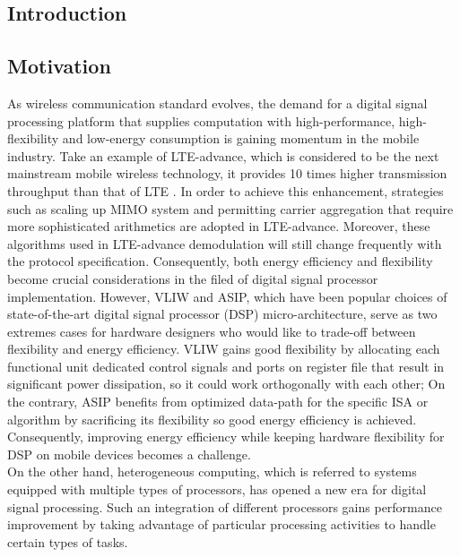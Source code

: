 \documentclass[12pt]{article}
\begin{document}
\begin{CJK}{UTF8}{bkai}
\doublespacing


\section{Introduction}

    \subsection{Motivation}
        As wireless communication standard evolves, the demand for a digital signal processing platform that supplies computation with high-performance, high-flexibility and low-energy consumption is gaining momentum in the mobile industry. 
        Take an example of LTE-advance, which is considered to be the next mainstream mobile wireless technology, it provides 10 times higher transmission throughput than that of LTE \cite{lte}. 
        In order to achieve this enhancement, strategies such as scaling up MIMO system and permitting carrier aggregation \cite{carrier} that require more sophisticated arithmetics are adopted in LTE-advance.
        Moreover, these algorithms used in LTE-advance demodulation will still change frequently with the protocol specification.
        Consequently, both energy efficiency and flexibility become crucial considerations in the filed of digital signal processor implementation. 
        However, VLIW and ASIP, which have been popular choices of state-of-the-art digital signal processor (DSP) micro-architecture, serve as two extremes cases for hardware designers who would like to trade-off between flexibility and energy efficiency. 
        VLIW gains good flexibility by allocating each functional unit dedicated control signals and ports on register file that result in significant power dissipation, so it could work orthogonally with each other; 
        On the contrary, ASIP benefits from optimized data-path for the specific ISA or algorithm by sacrificing its flexibility so good energy efficiency is achieved. 
        Consequently, improving energy efficiency while keeping hardware flexibility for DSP on mobile devices becomes a challenge.	
        \\\indent 
        On the other hand, heterogeneous computing, which is referred to systems equipped with multiple types of processors, has opened a new era for digital signal processing. 
        Such an integration of different processors gains performance improvement by taking advantage of particular processing activities to handle certain types of tasks.

\end{CJK}
\end{document}
